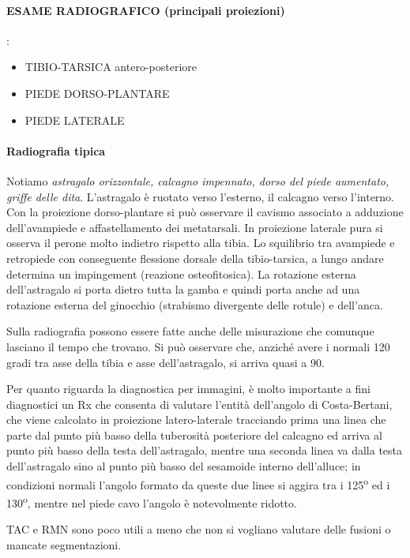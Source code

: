 \paragraph{ESAME RADIOGRAFICO (principali proiezioni)}:

\begin{itemize}
\item
  TIBIO-TARSICA antero-posteriore
\item
  PIEDE DORSO-PLANTARE
\item
  PIEDE LATERALE
\end{itemize}

\paragraph{Radiografia tipica}
Notiamo \emph{astragalo orizzontale, calcagno impennato, dorso del piede aumentato, griffe delle dita}.
L'astragalo è ruotato verso l'esterno, il calcagno verso l'interno. Con la proiezione dorso-plantare si può osservare il cavismo associato a adduzione dell'avampiede e affastellamento dei metatarsali. In proiezione laterale pura si osserva il perone molto indietro rispetto alla tibia. Lo squilibrio tra avampiede e retropiede con conseguente flessione dorsale della tibio-tarsica, a lungo andare determina un impingement (reazione osteofitosica). La rotazione esterna dell'astragalo si porta dietro tutta la gamba e quindi porta anche ad una rotazione esterna del ginocchio (strabismo divergente delle rotule) e dell'anca.

Sulla radiografia possono essere fatte anche delle misurazione che comunque lasciano il tempo che trovano. Si può osservare che, anziché avere i normali 120 gradi tra asse della tibia e asse dell'astragalo, si arriva quasi a 90.

Per quanto riguarda la diagnostica per immagini, è molto importante a fini diagnostici un Rx che consenta di valutare l'entità dell'angolo di Costa-Bertani, che viene calcolato in proiezione latero-laterale tracciando prima una linea che parte dal punto più basso della tuberosità posteriore del calcagno ed arriva al punto più basso della testa dell'astragalo, mentre una seconda linea va dalla testa dell'astragalo sino al punto più basso del sesamoide interno dell'alluce; in condizioni normali l'angolo formato da queste due linee si aggira tra i 125\textsuperscript{o} ed i 130\textsuperscript{o}, mentre nel piede cavo l'angolo è notevolmente ridotto.

TAC e RMN sono poco utili a meno che non si vogliano valutare delle fusioni o mancate segmentazioni.

